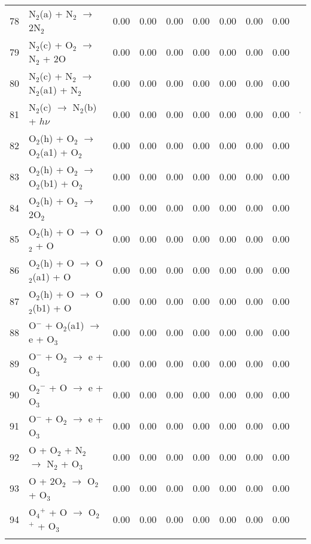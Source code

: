 \documentclass{article}
\begin{document}
\begin{table}[H]
{\begin{tabu}{clcccccccc}
      78 & N$_{2}$(a) + N$_{2}$ $\rightarrow$ 2N$_{2}$ & 0.00 & 0.00 & 0.00 & 0.00 & 0.00 & 0.00 & 0.00 &  \footnotemark[10]\\
      79 & N$_{2}$(c) + O$_{2}$ $\rightarrow$ N$_{2}$ + 2O & 0.00 & 0.00 & 0.00 & 0.00 & 0.00 & 0.00 & 0.00 &  \footnotemark[12]\\
      80 & N$_{2}$(c) + N$_{2}$ $\rightarrow$ N$_{2}$(a1) + N$_{2}$ & 0.00 & 0.00 & 0.00 & 0.00 & 0.00 & 0.00 & 0.00 &  \footnotemark[12]\\
      81 & N$_{2}$(c) $\rightarrow$ N$_{2}$(b) + $h\nu$ & 0.00 & 0.00 & 0.00 & 0.00 & 0.00 & 0.00 & 0.00 &  \footnotemark[8]$^{,}$\footnotemark[12]\\
      82 & O$_{2}$(h) + O$_{2}$ $\rightarrow$ O$_{2}$(a1) + O$_{2}$ & 0.00 & 0.00 & 0.00 & 0.00 & 0.00 & 0.00 & 0.00 &  \\
      83 & O$_{2}$(h) + O$_{2}$ $\rightarrow$ O$_{2}$(b1) + O$_{2}$ & 0.00 & 0.00 & 0.00 & 0.00 & 0.00 & 0.00 & 0.00 &  \\
      84 & O$_{2}$(h) + O$_{2}$ $\rightarrow$ 2O$_{2}$ & 0.00 & 0.00 & 0.00 & 0.00 & 0.00 & 0.00 & 0.00 &  \\
      85 & O$_{2}$(h) + O $\rightarrow$ O$_{2}$ + O & 0.00 & 0.00 & 0.00 & 0.00 & 0.00 & 0.00 & 0.00 &  \\
      86 & O$_{2}$(h) + O $\rightarrow$ O$_{2}$(a1) + O & 0.00 & 0.00 & 0.00 & 0.00 & 0.00 & 0.00 & 0.00 &  \\
      87 & O$_{2}$(h) + O $\rightarrow$ O$_{2}$(b1) + O & 0.00 & 0.00 & 0.00 & 0.00 & 0.00 & 0.00 & 0.00 &  \\
      88 & O$^{-}$ + O$_{2}$(a1) $\rightarrow$ e + O$_{3}$ & 0.00 & 0.00 & 0.00 & 0.00 & 0.00 & 0.00 & 0.00 &  \\
      89 & O$^{-}$ + O$_{2}$ $\rightarrow$ e + O$_{3}$ & 0.00 & 0.00 & 0.00 & 0.00 & 0.00 & 0.00 & 0.00 &  \\
      90 & O$_{2}$$^{-}$ + O $\rightarrow$ e + O$_{3}$ & 0.00 & 0.00 & 0.00 & 0.00 & 0.00 & 0.00 & 0.00 &  \\
      91 & O$^{-}$ + O$_{2}$ $\rightarrow$ e + O$_{3}$ & 0.00 & 0.00 & 0.00 & 0.00 & 0.00 & 0.00 & 0.00 &  \\
      92 & O + O$_{2}$ + N$_{2}$ $\rightarrow$ N$_{2}$ + O$_{3}$ & 0.00 & 0.00 & 0.00 & 0.00 & 0.00 & 0.00 & 0.00 &  \\
      93 & O + 2O$_{2}$ $\rightarrow$ O$_{2}$ + O$_{3}$ & 0.00 & 0.00 & 0.00 & 0.00 & 0.00 & 0.00 & 0.00 &  \\
      94 & O$_{4}$$^{+}$ + O $\rightarrow$ O$_{2}$$^{+}$ + O$_{3}$ & 0.00 & 0.00 & 0.00 & 0.00 & 0.00 & 0.00 & 0.00 &  \\
$$
\end{tabu}}
\end{table}
\end{document}
